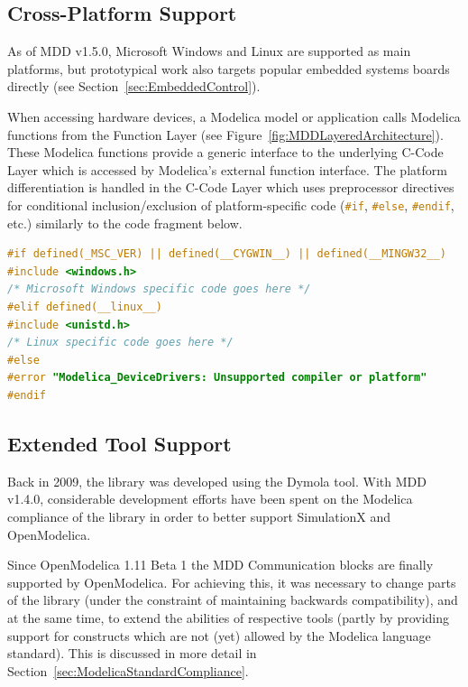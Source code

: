 \documentclass{resources/modelica}
\newcommand{\clang}[1]{\lstinline[language=c]|#1|}
\begin{document}
\subsection{Cross-Platform Support}
\label{sec:CrossPlatformSupport}

As of MDD v1.5.0, Microsoft Windows and Linux are supported as main platforms,
but prototypical work also targets popular embedded systems boards directly (see
Section~\ref{sec:EmbeddedControl}).

When accessing hardware devices, a Modelica model or
application calls Modelica functions from the \textsf{Function Layer} (see
Figure~\ref{fig:MDDLayeredArchitecture}). These Modelica functions provide a
generic interface to the underlying \textsf{C-Code Layer} which is accessed by
Modelica's external function interface.
The platform differentiation is handled in the \textsf{C-Code Layer} which
uses preprocessor directives for conditional inclusion/exclusion of
platform-specific code (\mbox{\clang{#if}}, \mbox{\clang{#else}},
\mbox{\clang{#endif}}, etc.) similarly to the code fragment below.
\begin{lstlisting}[language=C]
#if defined(_MSC_VER) || defined(__CYGWIN__) || defined(__MINGW32__)
#include <windows.h>
/* Microsoft Windows specific code goes here */
#elif defined(__linux__)
#include <unistd.h>
/* Linux specific code goes here */
#else
#error "Modelica_DeviceDrivers: Unsupported compiler or platform"
#endif
\end{lstlisting}

\subsection{Extended Tool Support}
\label{sec:ExtendedToolSupport}

Back in 2009, the library was developed using the Dymola tool. With MDD v1.4.0,
considerable development efforts have been spent on the Modelica compliance of
the library in order to better support SimulationX and OpenModelica.

Since OpenModelica 1.11 Beta 1 the MDD Communication blocks are finally
supported by OpenModelica. For achieving this, it was necessary to change parts
of the library (under the constraint of maintaining backwards compatibility),
and at the same time, to extend the abilities of respective tools (partly by
providing support for constructs which are not (yet) allowed by the Modelica
language standard). This is discussed in more detail in
Section~\ref{sec:ModelicaStandardCompliance}.
\end{document}
